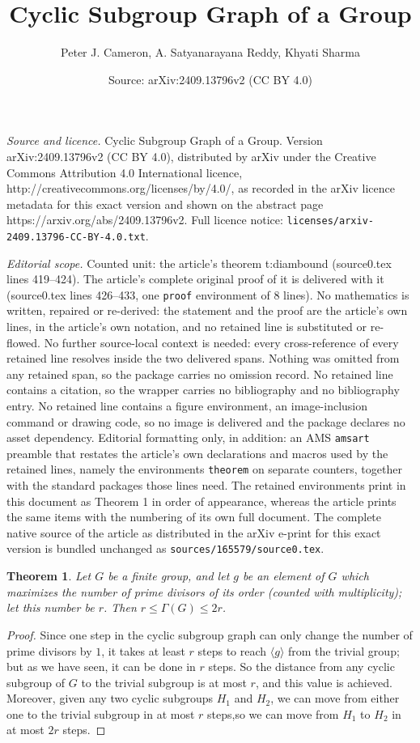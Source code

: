 \documentclass[10pt,a4paper]{amsart}
\title{Cyclic Subgroup Graph of a Group}
\author{Peter J. Cameron, A. Satyanarayana Reddy, Khyati Sharma}
\date{Source: arXiv:2409.13796v2 (CC BY 4.0)}
\newtheorem{theorem}{Theorem}
\def \Ga {{\Gamma }}
\begin{document}
\maketitle

\noindent\emph{Source and licence.} Cyclic Subgroup Graph of a Group. Version arXiv:2409.13796v2 (CC BY 4.0), distributed by arXiv under the Creative Commons Attribution 4.0 International licence, http://creativecommons.org/licenses/by/4.0/, as recorded in the arXiv licence metadata for this exact version and shown on the abstract page https://arxiv.org/abs/2409.13796v2. Full licence notice: \texttt{licenses/arxiv-2409.13796-CC-BY-4.0.txt}.\par\smallskip

\noindent\textit{Editorial scope.} Counted unit: the article's theorem t:diambound (source0.tex lines 419--424). The article's complete original proof of it is delivered with it (source0.tex lines 426--433, one \texttt{proof} environment of 8 lines). No mathematics is written, repaired or re-derived: the statement and the proof are the article's own lines, in the article's own notation, and no retained line is substituted or re-flowed.  No further source-local context is needed: every cross-reference of every retained line resolves inside the two delivered spans.  Nothing was omitted from any retained span, so the package carries no omission record.  No retained line contains a citation, so the wrapper carries no bibliography and no bibliography entry.  No retained line contains a figure environment, an image-inclusion command or drawing code, so no image is delivered and the package declares no asset dependency.  Editorial formatting only, in addition: an AMS \texttt{amsart} preamble that restates the article's own declarations and macros used by the retained lines, namely the environments \texttt{theorem} on separate counters, together with the standard packages those lines need.  The retained environments print in this document as Theorem 1 in order of appearance, whereas the article prints the same items with the numbering of its own full document.  The complete native source of the article as distributed in the arXiv e-print for this exact version is bundled unchanged as \texttt{sources/165579/source0.tex}.
\begin{theorem}
Let $G$ be a finite group, and let $g$ be an element of $G$ which maximizes the
number of prime divisors of its order (counted with multiplicity); let this
number be $r$. Then $r\le\Ga(G)\le 2r$.
\label{t:diambound}
\end{theorem}

\begin{proof}
Since one step in the cyclic subgroup graph can only change the number of prime
divisors by $1$, it takes at least $r$ steps to reach $\langle g\rangle$ from
the trivial group; but as we have seen, it can be done in $r$ steps. So the
distance from any cyclic subgroup of $G$ to the trivial subgroup is at most $r$,
and this value is achieved. Moreover, given any two cyclic subgroups $H_1$ and
$H_2$, we can move from either one to the trivial subgroup in at most $r$ steps,so we can move from $H_1$ to $H_2$ in at most $2r$ steps. 
\end{proof}
\end{document}
